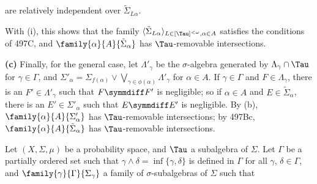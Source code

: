 {

\noindent are relatively independent over $\tilde\Sigma_{L\alpha}$.



\medskip

 With (i), this shows that the family
$\langle\tilde\Sigma_{L\alpha}\rangle_{L\in[\Tau]^{<\omega},\alpha\in A}$
satisfies the conditions of 497C, and
$\family{\alpha}{A}{\tilde\Sigma_{\alpha}}$ has $\Tau$-removable
intersections.

\medskip

{\bf (c)} Finally, for the general case, let $\Lambda'_{\gamma}$ be the
$\sigma$-algebra generated by $\Lambda_{\gamma}\cap\Tau$ for $\gamma\in\Gamma$, and
$\Sigma'_{\alpha}
=\Sigma_{f(\alpha)}\vee\bigvee_{\gamma\in\phi(\alpha)}\Lambda'_{\gamma}$ for
$\alpha\in A$.   If $\gamma\in\Gamma$ and $F\in\Lambda_{\gamma}$, there is an
$F'\in\Lambda'_{\gamma}$ such that $F\symmdiff F'$ is negligible;  so if
$\alpha\in A$ and $E\in\tilde\Sigma_{\alpha}$, there is an
$E'\in\Sigma'_{\alpha}$ such that $E\symmdiff E'$ is negligible.   By
(b), $\family{\alpha}{A}{\Sigma'_{\alpha}}$ has $\Tau$-removable
intersections;  by 497Bc,
$\family{\alpha}{A}{\tilde\Sigma_{\alpha}}$ has $\Tau$-removable
intersections.
}%

\cmmnt{ (\TaoIG)} %
Let $(X,\Sigma,\mu)$ be a
probability space, and $\Tau$ a subalgebra of $\Sigma$.   Let $\Gamma$ be a
partially ordered set such that $\gamma\wedge\delta=\inf\{\gamma,\delta\}$
is defined in $\Gamma$ for all
$\gamma$, $\delta\in\Gamma$, and $\family{\gamma}{\Gamma}{\Sigma_{\gamma}}$
a family of $\sigma$-subalgebras of $\Sigma$ such that


